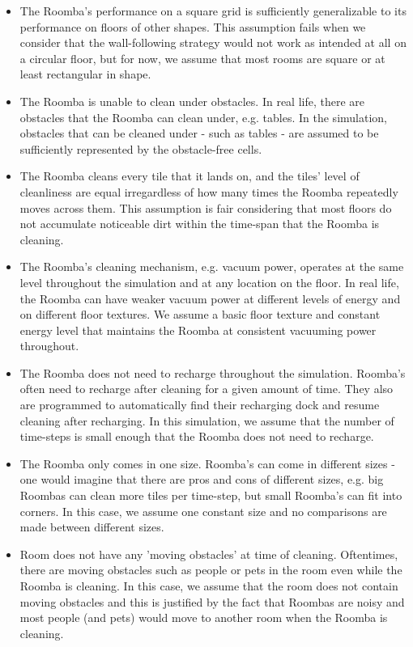 \documentclass[11pt]{article}
\begin{document}
\begin{itemize}
\item
  The Roomba's performance on a square grid is sufficiently
  generalizable to its performance on floors of other shapes. This
  assumption fails when we consider that the wall-following strategy
  would not work as intended at all on a circular floor, but for now, we
  assume that most rooms are square or at least rectangular in shape.
\item
  The Roomba is unable to clean under obstacles. In real life, there are
  obstacles that the Roomba can clean under, e.g. tables. In the
  simulation, obstacles that can be cleaned under - such as tables - are
  assumed to be sufficiently represented by the obstacle-free cells.
\item
  The Roomba cleans every tile that it lands on, and the tiles' level of
  cleanliness are equal irregardless of how many times the Roomba
  repeatedly moves across them. This assumption is fair considering that
  most floors do not accumulate noticeable dirt within the time-span
  that the Roomba is cleaning.
\item
  The Roomba's cleaning mechanism, e.g. vacuum power, operates at the
  same level throughout the simulation and at any location on the floor.
  In real life, the Roomba can have weaker vacuum power at different
  levels of energy and on different floor textures. We assume a basic
  floor texture and constant energy level that maintains the Roomba at
  consistent vacuuming power throughout.
\item
  The Roomba does not need to recharge throughout the simulation.
  Roomba's often need to recharge after cleaning for a given amount of
  time. They also are programmed to automatically find their recharging
  dock and resume cleaning after recharging. In this simulation, we
  assume that the number of time-steps is small enough that the Roomba
  does not need to recharge.
\item
  The Roomba only comes in one size. Roomba's can come in different
  sizes - one would imagine that there are pros and cons of different
  sizes, e.g. big Roombas can clean more tiles per time-step, but small
  Roomba's can fit into corners. In this case, we assume one constant
  size and no comparisons are made between different sizes.
\item
  Room does not have any 'moving obstacles' at time of cleaning.
  Oftentimes, there are moving obstacles such as people or pets in the
  room even while the Roomba is cleaning. In this case, we assume that
  the room does not contain moving obstacles and this is justified by
  the fact that Roombas are noisy and most people (and pets) would move
  to another room when the Roomba is cleaning.
\end{itemize}
\end{document}
